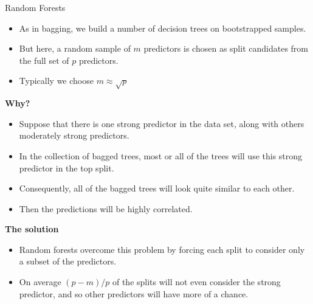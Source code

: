 \begin{frame}{Random Forests}
    \begin{itemize}
        \item As in bagging, we build a number of decision trees on bootstrapped samples. \pause 

        \item But here, a random sample of $m$ predictors is chosen as split candidates from the full set of $p$ predictors. \pause

        \item Typically we choose $m \approx \sqrt{p}$ \pause 
    \end{itemize}

    \textbf{Why?} \pause 

    \begin{itemize}
    \item Suppose that there is one strong predictor in the data set, along with others moderately strong predictors. \pause 

    \item In the collection of bagged trees, most or all of the trees will use this strong predictor in the top split. \pause 

    \item Consequently, all of the bagged trees will look quite similar to each other. \pause 

    \item Then the predictions will be highly correlated. \pause 
\end{itemize}


\textbf{The solution} \pause 

    \begin{itemize}
        \item Random forests overcome this problem by forcing each split to consider only a subset of the predictors. \pause 
        
        \item On average $(p - m)/p$ of the splits will not even consider the strong predictor, and so other predictors will have more of a chance.
    \end{itemize}
    

    
\end{frame}